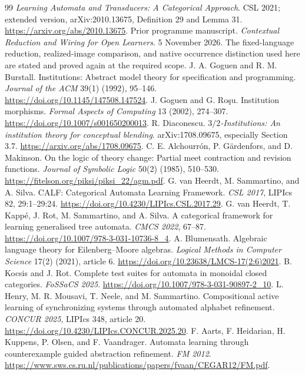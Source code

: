 \documentclass[11pt]{article}
\theoremstyle{definition}
\theoremstyle{remark}\newtheorem{remark}[theorem]{Remark}
\begin{document}
\begin{thebibliography}{99}
\emph{Learning Automata and Transducers: A Categorical Approach}.
CSL 2021; extended version, arXiv:2010.13675, Definition 29 and Lemma 31.
\url{https://arxiv.org/abs/2010.13675}.
 Prior programme manuscript.
\emph{Contextual Reduction and Wiring for Open Learners}.
5 November 2026. The fixed-language reduction, realized-image comparison,
and native occurrence distinction used here are stated and proved again
at the required scope.
 J. A. Goguen and R. M. Burstall.
Institutions: Abstract model theory for specification and programming.
\emph{Journal of the ACM} 39(1) (1992), 95--146.
\url{https://doi.org/10.1145/147508.147524}.
 J. Goguen and G. Ro\c{s}u.
Institution morphisms. \emph{Formal Aspects of Computing} 13 (2002), 274--307.
\url{https://doi.org/10.1007/s001650200013}.
 R. Diaconescu.
\emph{$3/2$-Institutions: An institution theory for conceptual blending}.
arXiv:1708.09675, especially Section 3.7.
\url{https://arxiv.org/abs/1708.09675}.
 C. E. Alchourr\'on, P. G\"ardenfors, and D. Makinson.
On the logic of theory change: Partial meet contraction and revision functions.
\emph{Journal of Symbolic Logic} 50(2) (1985), 510--530.
\url{https://fitelson.org/piksi/piksi_22/agm.pdf}.
 G. van Heerdt, M. Sammartino, and A. Silva.
CALF: Categorical Automata Learning Framework. \emph{CSL 2017},
LIPIcs 82, 29:1--29:24.
\url{https://doi.org/10.4230/LIPIcs.CSL.2017.29}.
 G. van Heerdt, T. Kapp\'e, J. Rot, M. Sammartino,
and A. Silva. A categorical framework for learning generalised tree automata.
\emph{CMCS 2022}, 67--87.
\url{https://doi.org/10.1007/978-3-031-10736-8_4}.
 A. Blumensath.
Algebraic language theory for Eilenberg--Moore algebras.
\emph{Logical Methods in Computer Science} 17(2) (2021), article 6.
\url{https://doi.org/10.23638/LMCS-17(2:6)2021}.
 B. Kocsis and J. Rot.
Complete test suites for automata in monoidal closed categories.
\emph{FoSSaCS 2025}.
\url{https://doi.org/10.1007/978-3-031-90897-2_10}.
 L. Henry, M. R. Mousavi, T. Neele, and M. Sammartino.
Compositional active learning of synchronizing systems through automated
alphabet refinement. \emph{CONCUR 2025}, LIPIcs 348, article 20.
\url{https://doi.org/10.4230/LIPIcs.CONCUR.2025.20}.
 F. Aarts, F. Heidarian, H. Kuppens, P. Olsen, and F. Vaandrager.
Automata learning through counterexample guided abstraction refinement.
\emph{FM 2012}.
\url{https://www.sws.cs.ru.nl/publications/papers/fvaan/CEGAR12/FM.pdf}.

\end{thebibliography}
\end{document}

